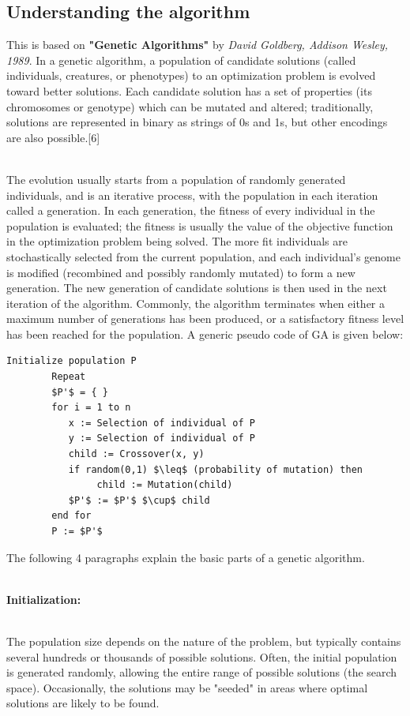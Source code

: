 \documentclass[a4paper, 12pt]{article}
\begin{document}
\subsection{Understanding the algorithm}
This is based on \textbf{"Genetic Algorithms"} by \textit{David Goldberg, Addison Wesley, 1989}. In a genetic algorithm, a population of candidate solutions (called individuals, creatures, or phenotypes) to an optimization problem is evolved toward better solutions. Each candidate solution has a set of properties (its chromosomes or genotype) which can be mutated and altered; traditionally, solutions are represented in binary as strings of 0s and 1s, but other encodings are also possible.[6]\par
\noindent
\\The evolution usually starts from a population of randomly generated individuals, and is an iterative process, with the population in each iteration called a generation. In each generation, the fitness of every individual in the population is evaluated; the fitness is usually the value of the objective function in the optimization problem being solved. The more fit individuals are stochastically selected from the current population, and each individual's genome is modified (recombined and possibly randomly mutated) to form a new generation. The new generation of candidate solutions is then used in the next iteration of the algorithm. Commonly, the algorithm terminates when either a maximum number of generations has been produced, or a satisfactory fitness level has been reached for the population.
 A generic pseudo code of GA is given below:
\begin{lstlisting}[mathescape]
        Initialize population P
        Repeat
        $P'$ = { }
        for i = 1 to n
           x := Selection of individual of P
           y := Selection of individual of P
           child := Crossover(x, y)
           if random(0,1) $\leq$ (probability of mutation) then
                child := Mutation(child)
           $P'$ := $P'$ $\cup$ child
        end for
        P := $P'$
\end{lstlisting}
The following 4 paragraphs explain the basic parts of a genetic algorithm.\\~\\
\begin{large}\textbf{Initialization:}\end{large}\\
The population size depends on the nature of the problem, but typically contains several hundreds or thousands of possible solutions. Often, the initial population is generated randomly, allowing the entire range of possible solutions (the search space). Occasionally, the solutions may be "seeded" in areas where optimal solutions are likely to be found.\\~\\
\end{document}
